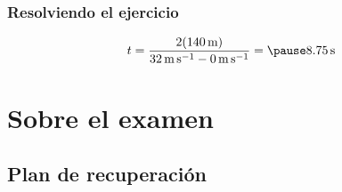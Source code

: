 \documentclass[14pt]{beamer}
\begin{document}
\begin{frame}
\frametitle{Resolviendo el ejercicio}
\pause
\begin{eqnarray*}
\begin{aligned}
t = \dfrac{2 (\SI{140}{\meter})}{\SI{32}{\meter\per\second} - \SI{0}{\meter\per\second}} = \pause \SI{8.75}{\second}
\end{aligned}
\end{eqnarray*}
\end{frame}

\section{Sobre el examen}
\subsection{Plan de recuperación}
\end{document}
